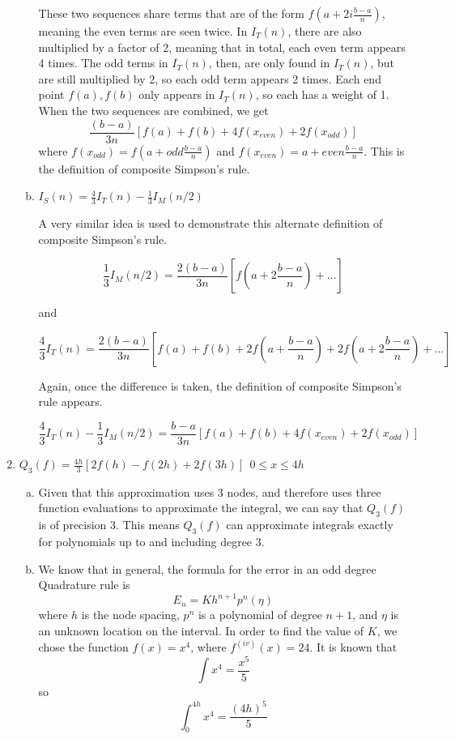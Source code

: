 \documentclass[11pt]{article}
\begin{document}
\begin{enumerate}
\begin{enumerate}[(a)]
		These two sequences share terms that are of the form $f(a+2i\frac{b-a}{n})$, meaning the even terms are seen twice. In $I_T(n)$, there are also multiplied by a factor of 2, meaning that in total, each even term appears 4 times. The odd terms in $I_T(n)$, then, are only found in $I_T(n)$, but are still multiplied by 2, so each odd term appears 2 times. Each end point $f(a), f(b)$ only appears in $I_T(n)$, so each has a weight of 1. When the two sequences are combined, we get
		\[
		\frac{(b-a)}{3n}[f(a) + f(b) + 4f(x_{even}) + 2f(x_{odd})]
		\]
		where $f(x_{odd}) = f(a+odd\frac{b-a}{n})$ and $f(x_{even}) = a+even\frac{b-a}{n}$. This is the definition of composite Simpson's rule.

		\medskip

		\item $I_S(n) = \frac{4}{3}I_T(n) - \frac{1}{3}I_M(n/2)$

		A very similar idea is used to demonstrate this alternate definition of composite Simpson's rule.

		\[
		\frac{1}{3}I_M(n/2) = \frac{2(b-a)}{3n}[f(a+2\frac{b-a}{n}) + \ldots]
		\]

		and

		\[
		\frac{4}{3}I_T(n) = \frac{2(b-a)}{3n}[f(a) + f(b) + 2f(a+\frac{b-a}{n}) + 2f(a+2\frac{b-a}{n}) + \ldots]
		\]

		Again, once the difference is taken, the definition of composite Simpson's rule appears.

		\[
		\frac{4}{3}I_T(n) - \frac{1}{3}I_M(n/2) = \frac{b-a}{3n}[f(a) + f(b) + 4f(x_{even}) + 2f(x_{odd})]
		\]

		\medskip

	\end{enumerate}

	\item $Q_3(f) = \frac{4h}{3}[2f(h)-f(2h)+2f(3h)]\ \ 0\leq x \leq 4h$

		\begin{enumerate}[(a)]

		\item Given that this approximation uses 3 nodes, and therefore uses three function evaluations to approximate the integral, we can say that $Q_3(f)$ is of precision $3$. This means $Q_3(f)$ can approximate integrals exactly for polynomials up to and including degree 3.

		\medskip

		\item We know that in general, the formula for the error in an odd degree Quadrature rule is
		$$E_n =  Kh^{n+1}p^n(\eta)$$
		where $h$ is the node spacing, $p^n$ is a polynomial of degree $n+1$, and $\eta$ is an unknown location on the interval. In order to find the value of $K$, we chose the function $f(x) = x^4$, where $f^{(iv)}(x) = 24$. It is known that $$\int x^4 = \frac{x^5}{5}$$ so $$\int_{0}^{4h}x^4 = \frac{(4h)^5}{5}$$


\end{enumerate}
\end{enumerate}
\end{document}
